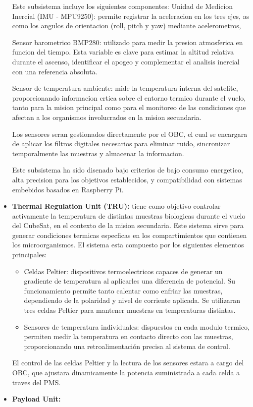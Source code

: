 \begin{itemize}
      Este subsistema incluye los siguientes componentes:
      Unidad de Medicion Inercial (IMU - MPU9250): permite registrar la aceleracion en los
      tres ejes, as como los angulos de orientacion (roll, pitch y yaw) mediante acelerometros,

      Sensor barometrico BMP280: utilizado para medir la presion atmosferica en funcion
      del tiempo. Esta variable es clave para estimar la altitud relativa durante el ascenso,
      identificar el apogeo y complementar el analisis inercial con una referencia absoluta.

      Sensor de temperatura ambiente: mide la temperatura interna del satelite, proporcionando
      informacion crtica sobre el entorno termico durante el vuelo, tanto para la
      mision principal como para el monitoreo de las condiciones que afectan a los organismos
      involucrados en la mision secundaria.

      Los sensores seran gestionados directamente por el OBC, el cual se encargara de aplicar los
      filtros digitales necesarios para eliminar ruido, sincronizar temporalmente las
      muestras y almacenar la informacion.

      Este subsistema ha sido disenado bajo criterios de bajo consumo energetico, alta precision para
      los objetivos establecidos, y compatibilidad con sistemas embebidos basados
      en Raspberry Pi.

      \item \textbf{Thermal Regulation Unit (TRU):} tiene como objetivo controlar activamente la
      temperatura de distintas muestras biologicas durante el vuelo del CubeSat, en el contexto de la
      mision secundaria. Este sistema sirve para generar condiciones termicas
      especficas en los compartimientos que contienen los microorganismos.
      El sistema esta compuesto por los siguientes elementos principales:

      \begin{itemize}
        \item Celdas Peltier: dispositivos termoelectricos capaces de generar un gradiente de
          temperatura al aplicarles una diferencia de potencial. Su funcionamiento permite
          tanto calentar como enfriar las muestras, dependiendo de la polaridad y nivel de
          corriente aplicada. Se utilizaran tres celdas Peltier para mantener muestras en
          temperaturas distintas.

        \item Sensores de temperatura individuales: dispuestos en cada modulo termico, permiten medir la
          temperatura en contacto directo con las muestras, proporcionando
            una retroalimentación precisa al sistema de control.
      \end{itemize}

      El control de las celdas Peltier y la lectura de los sensores estara a cargo del OBC, que
      ajustara dinamicamente la potencia suministrada a cada celda a traves del PMS.

      \item \textbf{Payload Unit:}


    \end{itemize}

